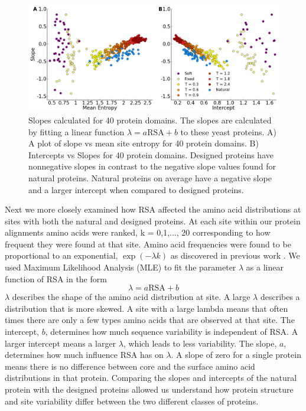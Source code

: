 \documentclass[12pt]{article}
\begin{document}
\begin{figure}[H]
\centering
\centerline{\includegraphics[width = 6in]{figures/Slope_Combination_Plot_Noah.png}}
\caption{Slopes calculated for 40 protein domains. The slopes are calculated by fitting a linear function $\lambda=a\text{RSA}+b$ to these yeast proteins.  A) A plot of slope vs mean site entropy for 40 protein domains. B) Intercepts vs Slopes for 40 protein domains. Designed proteins have nonnegative slopes in contrast to the negative slope values found for natural proteins.  Natural proteins on average have a negative slope and a larger intercept when compared to designed proteins.}
\label{NoahStructureFig3}
\end{figure}

\par Next we more closely examined how RSA affected the amino acid distributions at sites with both the natural and designed proteins. At each site within our protein alignments amino acids were ranked, k = 0,1,..., 20 corresponding to how frequent they were found at that site. Amino acid frequencies were found to be proportional to an exponential, $\exp (-\lambda k)$ as discovered in previous work \cite{Ramsey2011}. We used Maximum Likelihood Analysis (MLE) to fit the parameter $\lambda$ as a linear function of RSA in the form $$ \lambda = a \text{RSA} + b $$ $\lambda$ describes the shape of the amino acid distribution at site. A large $\lambda$ describes a distribution that is more skewed. A site with a large lambda means that often times there are only a few types amino acids that are observed at that site. The intercept, $b$, determines how much sequence variability is independent of RSA. A larger intercept means a larger $\lambda$, which leads to less variability. The slope, $a$, determines how much influence RSA has on $\lambda$. A slope of zero for a single protein means there is no difference between core and the surface amino acid distributions in that protein. Comparing the slopes and intercepts of the natural protein with the designed proteins allowed us understand how protein structure and site variability differ between the two different classes of proteins. 
\end{document}
